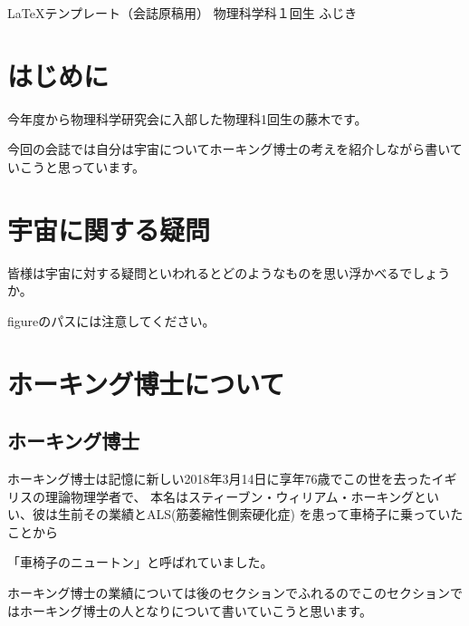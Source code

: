 \documentclass[10pt,b5paper,papersize,dvipdfmx]{jsbook}
\begin{document}


\kaishititle%
  {\LaTeX テンプレート（会誌原稿用）}%
  {物理科学科１回生}%
  {ふじき}%

%
\section*{はじめに}
今年度から物理科学研究会に入部した物理科1回生の藤木です。\par
今回の会誌では自分は宇宙についてホーキング博士の考えを紹介しながら書いていこうと思っています。

\newpage
%
\section{宇宙に関する疑問}
皆様は宇宙に対する疑問といわれるとどのようなものを思い浮かべるでしょうか。\par
figureのパスには注意してください。

\newpage


\section{ ホーキング博士について}

\subsection{ホーキング博士}
ホーキング博士は記憶に新しい2018年3月14日に享年76歳でこの世を去ったイギリスの理論物理学者で、
本名はスティーブン・ウィリアム・ホーキングといい、彼は生前その業績とALS(筋萎縮性側索硬化症)
を患って車椅子に乗っていたことから\par
「車椅子のニュートン」と呼ばれていました。\par
ホーキング博士の業績については後のセクションでふれるのでこのセクションではホーキング博士の人となりについて書いていこうと思います。\par
\,\par
\end{document}
